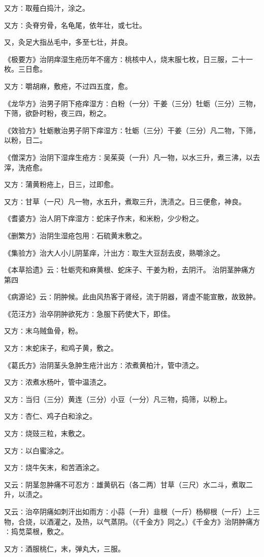 \documentclass[a4paper,12pt,UTF8,twoside]{ctexbook}
\begin{document}
又方∶取薤白捣汁，涂之。

又方∶灸脊穷骨，名龟尾，依年壮，或七壮。

又，灸足大指丛毛中，多至七壮，并良。

《极要方》治阴痒湿生疮历年不瘥方∶桃核中人，烧末服七枚，日三服，二十一枚。三日愈。

又方∶嚼胡麻，敷疮，不过四五度，愈。

《龙华方》治男子阴下疮痒湿方∶白粉（一分）干姜（三分）牡蛎（三分）三物，下筛，欲卧时粉，夜三四，粉之。

《效验方》牡蛎散治男子阴下痒湿方∶牡蛎（三分）干姜（三分）凡二物，下筛，以粉，日二。

《僧深方》治阴下湿痒生疮方∶吴茱萸（一升）凡一物，以水三升，煮三沸，以去滓，洗疮愈。

又方∶蒲黄粉疮上，日三，过即愈。

又方∶甘草（一尺）凡一物，水五升，煮取三升，洗渍之。日三便愈，神良。

《耆婆方》治人阴下痒湿方∶蛇床子作末，和米粉，少少粉之。

《删繁方》治阴生湿疮包用∶石硫黄末敷之。

《集验方》治大人小儿阴茎痒，汁出方∶取生大豆刮去皮，熟嚼涂之。

《本草拾遗》云∶牡蛎壳和麻黄根、蛇床子、干姜为粉，去阴汗。
治阴茎肿痛方第四

《病源论》云∶阴肿候。此由风热客于肾经，流于阴器，肾虚不能宣散，故致肿。

《范汪方》治卒阴肿欲死方∶急服下药使大下，即佳。

又方∶末乌贼鱼骨，粉。

又方∶末蛇床子，和鸡子黄，敷之。

《葛氏方》治阴茎头急肿生疮汁出方∶浓煮黄柏汁，管中渍之。

又方∶浓煮水杨叶，管中温渍之。

又方∶当归（三分）黄连（三分）小豆（一分）凡三物，捣筛，以粉上。

又方∶杏仁、鸡子白和涂之。

又方∶烧豉三粒，末敷之。

又方∶以白蜜涂之。

又方∶烧牛矢末，和苦酒涂之。

又云∶阴茎忽肿痛不可忍方∶雄黄矾石（各二两）甘草（三尺）水二斗，煮取二升，以渍之。

又云∶治卒阴痛如刺汗出如雨方∶小蒜（一升）韭根（一斤）杨柳根（一斤）上三物，合烧，以酒灌之，及热，以气蒸阴。（《千金方》同之。）《千金方》治阴肿痛方∶捣苋菜根，敷之。

又方∶酒服桃仁，末，弹丸大，三服。
\end{document}
